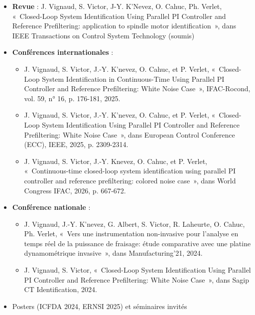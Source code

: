 \documentclass{style/presentation}
\begin{document}
\begin{frame}

    \hfill
    \hfill
    \hfill
    \vspace{1mm}

    \begin{itemize}
        \item \textbf{Revue} : J. Vignaud, S. Victor, J-Y. K'Nevez, O. Cahuc, Ph. Verlet, «~Closed-Loop System Identification Using Parallel PI Controller and Reference Prefiltering: application to spindle motor identification~», dans IEEE Transactions on Control System Technology (soumis)
        \item \textbf{Conférences internationales} : 
        \begin{itemize}
            \item J. Vignaud, S. Victor, J.-Y. K’nevez, O. Cahuc, et P. Verlet, «~Closed-Loop System Identification in Continuous-Time Using Parallel PI Controller and Reference Prefiltering: White Noise Case~», IFAC-Rocond, vol. 59, n° 16, p. 176-181, 2025.
            \item J. Vignaud, S. Victor, J.-Y. K’nevez, O. Cahuc, et P. Verlet, «~Closed-Loop System Identification Using Parallel PI Controller and Reference Prefiltering: White Noise Case~», dans European Control Conference (ECC), IEEE, 2025, p. 2309-2314.
            \item J. Vignaud, S. Victor, J.-Y. Knevez, O. Cahuc, et P. Verlet, «~Continuous-time closed-loop system identification using parallel PI controller and reference prefiltering: colored noise case~», dans World Congress IFAC, 2026, p. 667-672.
        \end{itemize}
        \item \textbf{Conférence nationale} : 
        \begin{itemize}
            \item J. Vignaud, J.-Y. K’nevez, G. Albert, S. Victor, R. Laheurte, O. Cahuc, Ph. Verlet, «~Vers une instrumentation non-invasive pour l’analyse en temps réel de la puissance de fraisage: étude comparative avec une platine dynamométrique invasive~», dans Manufacturing’21, 2024.
            \item J. Vignaud, S. Victor, «~Closed-Loop System Identification Using Parallel PI Controller and Reference Prefiltering: White Noise Case~», dans Sagip CT Identification, 2024.
        \end{itemize}
        \item Posters (ICFDA 2024, ERNSI 2025) et séminaires invités
    \end{itemize}
\end{frame}
\end{document}
